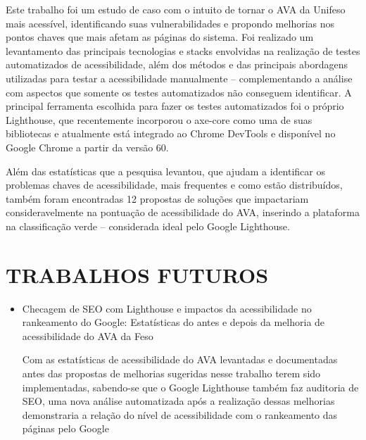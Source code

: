 \documentclass[
	12pt,				%
	openright,			%
	oneside,			%
	a4paper,			%
	chapter=TITLE,		%
	section=TITLE,		%
	subsection=TITLE,	%
	subsubsection=TITLE,%
	english,			%
	brazil				%
	]{abntex2}
\theoremstyle{definition}
\begin{document}
Este trabalho foi um estudo de caso com o intuito de tornar o AVA da Unifeso mais acessível, identificando suas vulnerabilidades e propondo melhorias nos pontos chaves que mais afetam as páginas do sistema. Foi realizado um levantamento das principais tecnologias e stacks envolvidas na realização de testes automatizados de acessibilidade, além dos métodos e das principais abordagens utilizadas para testar a acessibilidade manualmente – complementando a análise com aspectos que somente os testes automatizados não conseguem identificar. A principal ferramenta escolhida para fazer os testes automatizados foi o próprio Lighthouse, que recentemente incorporou o axe-core como uma de suas bibliotecas e atualmente está integrado ao Chrome DevTools e disponível no Google Chrome a partir da versão 60.

Além das estatísticas que a pesquisa levantou, que ajudam a identificar os problemas chaves de acessibilidade, mais frequentes e como estão distribuídos, também foram encontradas 12 propostas de soluções que impactariam consideravelmente na pontuação de acessibilidade do AVA, inserindo a plataforma na classificação verde – considerada ideal pelo Google Lighthouse.

\chapter{TRABALHOS FUTUROS}

\begin{itemize}

    \item Checagem de SEO com Lighthouse e impactos da acessibilidade no rankeamento do Google: Estatísticas do antes e depois da melhoria de acessibilidade do AVA da Feso
    
Com as estatísticas de acessibilidade do AVA levantadas e documentadas antes das propostas de melhorias sugeridas nesse trabalho terem sido implementadas, sabendo-se que o Google Lighthouse também faz auditoria de SEO, uma nova análise automatizada após a realização dessas melhorias demonstraria a relação do nível de acessibilidade com o rankeamento das páginas pelo Google

\end{itemize}

\postextual
\end{document}
